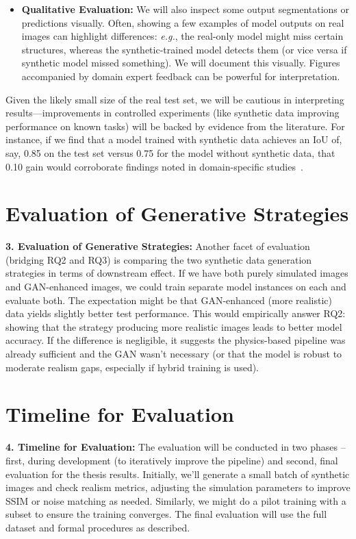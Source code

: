 \documentclass[
oneside,      %
openany       %
]{imc-inf}
\begin{document}
\begin{itemize}
		\item \textbf{Qualitative Evaluation:} We will also inspect some output segmentations or predictions visually. Often, showing a few examples of model outputs on real images can highlight differences: \emph{e.g.}, the real-only model might miss certain structures, whereas the synthetic-trained model detects them (or vice versa if synthetic model missed something). We will document this visually. Figures accompanied by domain expert feedback can be powerful for interpretation.
	\end{itemize}
	
	
	Given the likely small size of the real test set, we will be cautious in interpreting results—improvements in controlled experiments (like synthetic data improving performance on known tasks) will be backed by evidence from the literature. For instance, if we find that a model trained with synthetic data achieves an IoU of, say, 0.85 on the test set versus 0.75 for the model without synthetic data, that 0.10 gain would corroborate findings noted in domain-specific studies~\cite{zhang2023synthetic}.
	
	\section{Evaluation of Generative Strategies}
	\textbf{3. Evaluation of Generative Strategies:} Another facet of evaluation (bridging RQ2 and RQ3) is comparing the two synthetic data generation strategies in terms of downstream effect. If we have both purely simulated images and GAN-enhanced images, we could train separate model instances on each and evaluate both. The expectation might be that GAN-enhanced (more realistic) data yields slightly better test performance. This would empirically answer RQ2: showing that the strategy producing more realistic images leads to better model accuracy. If the difference is negligible, it suggests the physics-based pipeline was already sufficient and the GAN wasn’t necessary (or that the model is robust to moderate realism gaps, especially if hybrid training is used).
	
	\section{Timeline for Evaluation}
	\textbf{4. Timeline for Evaluation:} The evaluation will be conducted in two phases – first, during development (to iteratively improve the pipeline) and second, final evaluation for the thesis results. Initially, we’ll generate a small batch of synthetic images and check realism metrics, adjusting the simulation parameters to improve SSIM or noise matching as needed. Similarly, we might do a pilot training with a subset to ensure the training converges. The final evaluation will use the full dataset and formal procedures as described.
	
\end{document}
